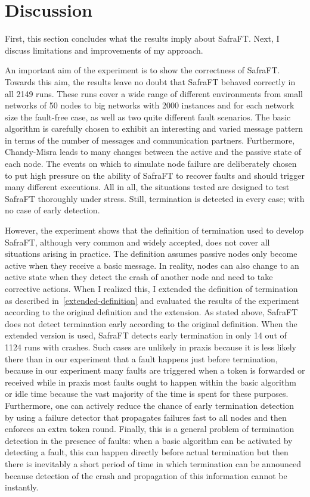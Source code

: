 \section{Discussion}
\label{sec:discussion}
First, this section concludes what the results imply about SafraFT. Next, I discuss limitations and improvements of my approach.

An important aim of the experiment is to show the correctness of SafraFT.
Towards this aim, the results leave no doubt that SafraFT behaved correctly in all 2149 %
runs.
These runs cover a wide range of different environments from small networks of 50 nodes to big networks with 2000 instances and for each network size the fault-free case, as well as two quite different fault scenarios.
The basic algorithm is carefully chosen to exhibit an interesting and varied message pattern in terms of the number of messages and communication partners.
Furthermore, Chandy-Misra leads to many changes between the active and the passive state of each node.
The events on which to simulate node failure are deliberately chosen to put high pressure on the ability of SafraFT to recover faults and should trigger many different executions.
All in all, the situations tested are designed to test SafraFT thoroughly under stress.
Still, termination is detected in every case; with no case of early detection.

However, the experiment shows that the definition of termination used to develop SafraFT, although very common and widely accepted, does not cover all situations arising in practice.
The definition assumes passive nodes only become active when they receive a basic message.
In reality, nodes can also change to an active state when they detect the crash of another node and need to take corrective actions.
When I realized this, I extended the definition of termination as described in~\cref{extended-definition} and evaluated the results of the experiment according to the original definition and the extension.
As stated above, SafraFT does not detect termination early according to the original definition.
When the extended version is used, SafraFT detects early termination in only 14 out of 1124 runs with crashes. %
Such cases are unlikely in praxis because it is less likely there than in our experiment that a fault happens just before termination, because in our experiment many faults are triggered when a token is forwarded or received while in praxis most faults ought to happen within the basic algorithm or idle time because the vast majority of the time is spent for these purposes.
Furthermore, one can actively reduce the chance of early termination detection by using a failure detector that propagates failures fast to all nodes and then enforces an extra token round.
Finally, this is a general problem of termination detection in the presence of faults:
when a basic algorithm can be activated by detecting a fault, this can happen directly before actual termination but then there is inevitably a short period of time in which termination can be announced because detection of the crash  and propagation of this information cannot be instantly.

